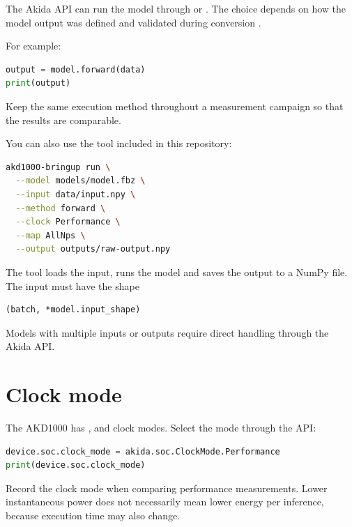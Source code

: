 The Akida API can run the model through  or .
The choice depends on how the model output was defined and validated during conversion
\cite{brainchip_akida_guide}.

For example:

\begin{lstlisting}[language=Python]
output = model.forward(data)
print(output)
\end{lstlisting}

Keep the same execution method throughout a measurement campaign so that the results
are comparable.

\pagebreak
You can also use the tool included in this repository:

\begin{lstlisting}[language=bash]
akd1000-bringup run \
  --model models/model.fbz \
  --input data/input.npy \
  --method forward \
  --clock Performance \
  --map AllNps \
  --output outputs/raw-output.npy
\end{lstlisting}

The tool loads the input, runs the model and saves the output to a NumPy file.
The input must have the shape

\begin{lstlisting}
(batch, *model.input_shape)
\end{lstlisting}

Models with multiple inputs or outputs require direct handling through the Akida API.

\section{Clock mode}

The AKD1000 has ,  and  clock modes.
Select the mode through the API:

\begin{lstlisting}[language=Python]
device.soc.clock_mode = akida.soc.ClockMode.Performance
print(device.soc.clock_mode)
\end{lstlisting}

Record the clock mode when comparing performance measurements. Lower instantaneous
power does not necessarily mean lower energy per inference, because execution time
may also change.
